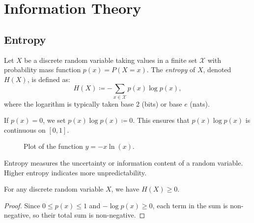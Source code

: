 \documentclass[../../main.tex]{subfiles}
\begin{document}
\section{Information Theory}
\label{section:information_theory}

\subsection{Entropy}

\begin{definition}[Entropy]
Let \( X \) be a discrete random variable taking values in a finite set \( \mathcal{X} \) with probability mass function \( p(x) = P(X = x) \). The \emph{entropy} of \( X \), denoted \( H(X) \), is defined as:
\[
H(X) \coloneqq - \sum_{x \in \mathcal{X}} p(x) \log p(x),
\]
where the logarithm is typically taken base 2 (bits) or base \( e \) (nats).
\end{definition}

\begin{remark}
    If $p(x) = 0$, we set $p(x) \log p(x) \coloneqq 0$. This ensures that $p(x) \log p(x)$ is continuous on $[0, 1]$.
\end{remark}

\begin{figure}[h]
    \centering
{}
    \caption{Plot of the function $y=-x\ln(x)$.}
\end{figure}

\begin{remark}
Entropy measures the uncertainty or information content of a random variable. Higher entropy indicates more unpredictability.
\end{remark}

\begin{proposition}
For any discrete random variable \( X \), we have \( H(X) \geq 0 \).
\end{proposition}
\vspace{-2.5em}
\begin{proof}
Since \( 0 \leq p(x) \leq 1 \) and \( -\log p(x) \geq 0 \), each term in the sum is non-negative, so their total sum is non-negative.
\end{proof}
\end{document}

